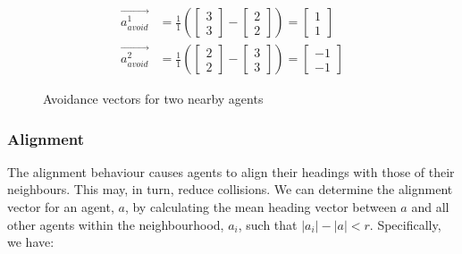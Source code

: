 \documentclass[12pt]{article}
\begin{document}
\begin{equation}
    \begin{aligned}
        \vec{a_{avoid}^1} &= \frac{1}{1} \left( \begin{bmatrix} 3 \\ 3 \end{bmatrix} - \begin{bmatrix} 2 \\ 2 \end{bmatrix} \right) = \begin{bmatrix} 1 \\ 1 \end{bmatrix} \\
        \vec{a_{avoid}^2} &= \frac{1}{1} \left( \begin{bmatrix} 2 \\ 2 \end{bmatrix} - \begin{bmatrix} 3 \\ 3 \end{bmatrix} \right) = \begin{bmatrix} -1 \\ -1 \end{bmatrix}
    \end{aligned}
\end{equation}

\begin{figure}[ht]
    \centering
    \caption{Avoidance vectors for two nearby agents}
    \label{fig:avoidance-2d}
\end{figure}


\subsubsection{Alignment}

The alignment behaviour causes agents to align their headings with those of their neighbours. This may, in turn, reduce collisions. We can determine the alignment vector for an agent, $a$, by calculating the mean heading vector between $a$ and all other agents within the neighbourhood, $a_i$, such that $|a_i| - |a| < r$. Specifically, we have:
\end{document}
